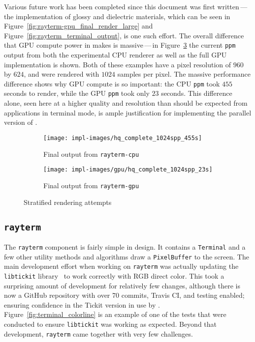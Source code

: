 Various future work has been completed since this document was first written\,---\,the implementation of glossy and dielectric materials, which can be seen in Figure~\ref{fig:rayterm-gpu_final_render_large} and Figure~\ref{fig:rayterm_terminal_output}, is one such effort.
The overall difference that GPU compute power in \name{} makes is massive\,---\,in Figure~\ref{fig:rayterm_final_ppm_outputs} the current \texttt{ppm} output from both the experimental CPU renderer as well as the full GPU \name{} implementation is shown.
Both of these examples have a pixel resolution of $960$ by $624$, and were rendered with $1024$ samples per pixel.
The massive performance difference shows why GPU compute is so important: the CPU \texttt{ppm} took $455$ seconds to render, while the GPU \texttt{ppm} took only $23$ seconds.
This difference alone, seen here at a higher quality and resolution than should be expected from applications in terminal mode, is ample justification for implementing the parallel version of \name{}.

\vspace{0.3em}
\begin{figure}[htb]
  \centering
  \begin{subfigure}[htb]{0.45\textwidth}
    \texttt{[image: impl-images/hq\_complete\_1024spp\_455s]}
    \caption{Final output from \texttt{rayterm-cpu}}
\label{fig:rayterm-cpu_final_ppm_output}
  \end{subfigure}
  \begin{subfigure}[htb]{0.45\textwidth}
    \texttt{[image: impl-images/gpu/hq\_complete\_1024spp\_23s]}
    \caption{Final output from \texttt{rayterm-gpu}}
\label{fig:rayterm-gpu_final_ppm_output}
  \end{subfigure}
  \caption{Stratified rendering attempts}
\label{fig:rayterm_final_ppm_outputs}
\end{figure}

\subsection{\texttt{rayterm}}\label{ch:implementation:final:rayterm}

The \texttt{rayterm} component is fairly simple in design.
It contains a \texttt{Terminal} and a few other utility methods and algorithms draw a \texttt{PixelBuffer} to the screen.
The main development effort when working on \texttt{rayterm} was actually updating the \texttt{libtickit} library~\cite{libtickitLibrary, libtickitCustom} to work correctly with RGB direct color.
This took a surprising amount of development for relatively few changes, although there is now a GitHub repository with over 70 commits, Travis CI, and testing enabled; ensuring confidence in the Tickit version in use by \name{}.
Figure~\ref{fig:terminal_colorline} is an example of one of the tests that were conducted to ensure \texttt{libtickit} was working as expected.
Beyond that development, \texttt{rayterm} came together with very few challenges.

